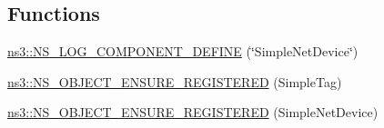\subsection*{Functions}
\begin{DoxyCompactItemize}
\item 
\hyperlink{namespacens3_a1d9ad95a4e46f0343b002df5140921ef}{ns3\+::\+N\+S\+\_\+\+L\+O\+G\+\_\+\+C\+O\+M\+P\+O\+N\+E\+N\+T\+\_\+\+D\+E\+F\+I\+NE} (\char`\"{}Simple\+Net\+Device\char`\"{})
\item 
\hyperlink{namespacens3_a5038e9c7f03b18b460b61df030ffd167}{ns3\+::\+N\+S\+\_\+\+O\+B\+J\+E\+C\+T\+\_\+\+E\+N\+S\+U\+R\+E\+\_\+\+R\+E\+G\+I\+S\+T\+E\+R\+ED} (Simple\+Tag)
\item 
\hyperlink{namespacens3_acba34b600a1a4dc91ead850a0e33ec41}{ns3\+::\+N\+S\+\_\+\+O\+B\+J\+E\+C\+T\+\_\+\+E\+N\+S\+U\+R\+E\+\_\+\+R\+E\+G\+I\+S\+T\+E\+R\+ED} (Simple\+Net\+Device)
\end{DoxyCompactItemize}
